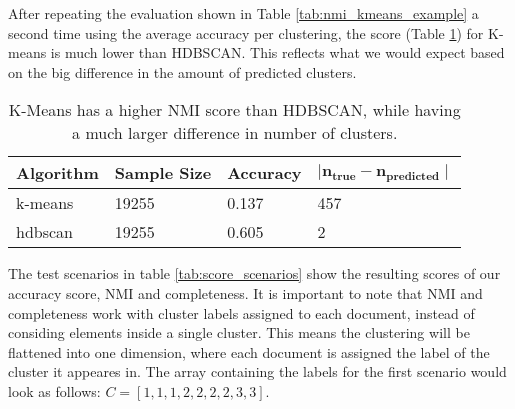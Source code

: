 After repeating the evaluation shown in Table \ref{tab:nmi_kmeans_example} a second time using the average accuracy per clustering, the score (Table \ref{tab:avg_predict_kmeans_example}) for K-means is much lower than HDBSCAN. This reflects what we would expect based on the big difference in the amount of predicted clusters.

\begin{table}[h]
    \centering
    \begin{tabular}{|l|l|l|l|}
    \hline
    \textbf{Algorithm} & \textbf{Sample Size} & \textbf{Accuracy}  & $\mathbf{ \mid n_{true} - n_{predicted} \mid }$ \\ \hline
    k-means & 19255 & 0.137 & 457 \\ \hline
    hdbscan & 19255 & 0.605 & 2 \\ \hline
    \end{tabular}
    \caption{K-Means has a higher NMI score than HDBSCAN, while having a much larger difference in number of clusters.}
    \label{tab:avg_predict_kmeans_example}
\end{table}

The test scenarios in table \ref{tab:score_scenarios} show the resulting scores of our accuracy score, NMI and completeness. It is important to note that NMI and completeness work with cluster labels assigned to each document, instead of considing elements inside a single cluster. This means the clustering will be flattened into one dimension, where each document is assigned the label of the cluster it appeares in. The array containing the labels for the first scenario would look as follows: $C=[1,1,1,2,2,2,2,3,3]$.

